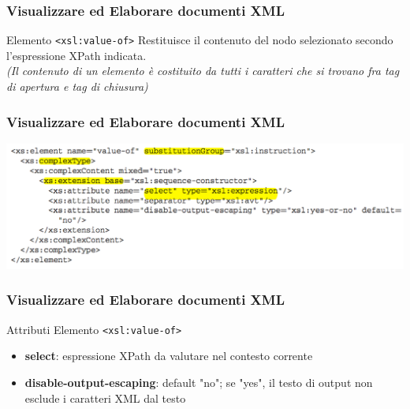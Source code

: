 
\begin{frame}
    \frametitle{Visualizzare ed Elaborare documenti XML}
    \addtocounter{nframe}{1}
    

     \begin{block}{Elemento \texttt{<xsl:value-of>}}
        Restituisce il contenuto del nodo selezionato secondo l'espressione XPath indicata.
        \\ \textit{(Il contenuto di un elemento è costituito da tutti i caratteri che si trovano fra tag di apertura e tag di chiusura)}
     \end{block}
    
\end{frame}

\begin{frame}
    \frametitle{Visualizzare ed Elaborare documenti XML}
    \addtocounter{nframe}{1}
    
    \begin{center}
        \includegraphics[width=.95\textwidth]{imgs/Schema-value-of.png}
    \end{center}

\end{frame}

\begin{frame}
    \frametitle{Visualizzare ed Elaborare documenti XML}
    \addtocounter{nframe}{1}
    

     \begin{block}{Attributi Elemento \texttt{<xsl:value-of>}}
         \begin{itemize}
             \item \textbf{select}: espressione XPath da valutare nel contesto corrente
             \item \textbf{disable-output-escaping}: default "no"; se "yes", il testo di
             output non esclude i caratteri XML dal testo
        \end{itemize}
     \end{block}
    
\end{frame}

